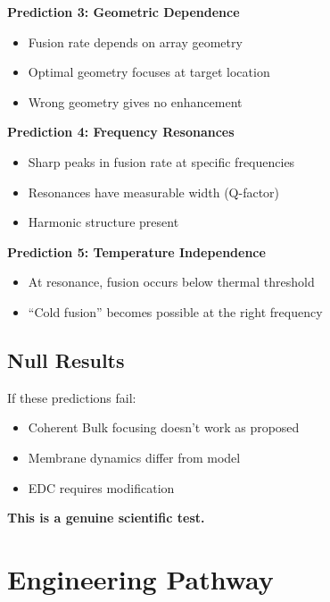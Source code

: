\documentclass[12pt,a4paper]{article}
\begin{document}
\begin{prediction}
\textbf{Prediction 3: Geometric Dependence}
\begin{itemize}
    \item Fusion rate depends on array geometry
    \item Optimal geometry focuses at target location
    \item Wrong geometry gives no enhancement
\end{itemize}
\end{prediction}

\begin{prediction}
\textbf{Prediction 4: Frequency Resonances}
\begin{itemize}
    \item Sharp peaks in fusion rate at specific frequencies
    \item Resonances have measurable width (Q-factor)
    \item Harmonic structure present
\end{itemize}
\end{prediction}

\begin{prediction}
\textbf{Prediction 5: Temperature Independence}
\begin{itemize}
    \item At resonance, fusion occurs below thermal threshold
    \item ``Cold fusion'' becomes possible at the right frequency
\end{itemize}
\end{prediction}

\subsection{Null Results}

If these predictions fail:
\begin{itemize}
    \item Coherent Bulk focusing doesn't work as proposed
    \item Membrane dynamics differ from model
    \item EDC requires modification
\end{itemize}

\textbf{This is a genuine scientific test.}

\section{Engineering Pathway}
\end{document}
